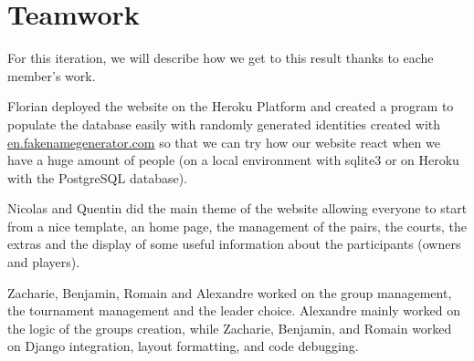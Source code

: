 \section{Teamwork}


For this iteration, we will describe how we get to this result thanks to
eache member's work. \newline

Florian deployed the website on the Heroku Platform and created a program
to populate the database easily with randomly generated identities created
with \url{en.fakenamegenerator.com} so that we can try how our website react
when we have a huge amount of people (on a local environment with sqlite3
or on Heroku with the PostgreSQL database). \newline

Nicolas and Quentin did the main theme of the website allowing everyone to
start from a nice template, an home page, the management of the pairs, the
courts, the extras and the display of some useful information about the
participants (owners and players). \newline

Zacharie, Benjamin, Romain and Alexandre worked on the group management,
the tournament management and the leader choice. Alexandre mainly worked on the logic of the groups creation, while Zacharie, Benjamin, and Romain worked on Django integration, layout formatting, and code debugging. \newline
